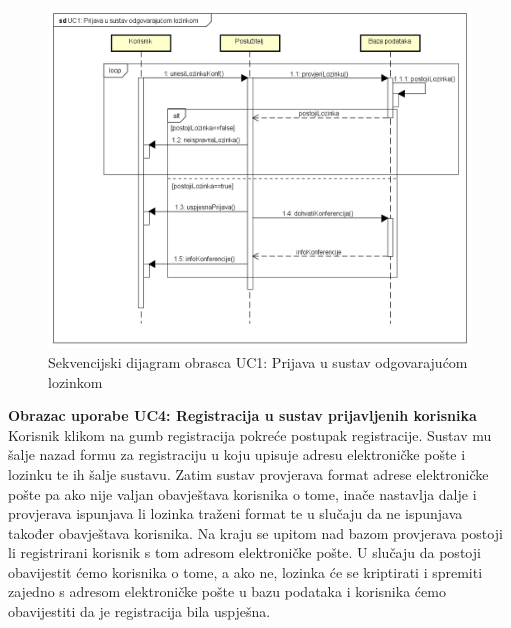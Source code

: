 				\begin{figure}[H]
					\includegraphics[width=\textwidth]{slike/uc1Sekvencijski.PNG} %
					\caption{Sekvencijski dijagram obrasca UC1: Prijava u sustav odgovarajućom lozinkom}
					\label{fig:uc1-sekvencijski} %
				\end{figure}
				\eject
					\textbf{Obrazac uporabe UC4: Registracija u sustav prijavljenih korisnika}\\
				Korisnik klikom na gumb registracija pokreće postupak registracije. Sustav mu šalje nazad formu za registraciju u koju upisuje adresu elektroničke pošte i lozinku te ih šalje sustavu. Zatim sustav provjerava format adrese elektroničke pošte pa ako nije valjan obavještava korisnika o tome, inače nastavlja dalje i provjerava ispunjava li lozinka traženi format te u slučaju da ne ispunjava također obavještava korisnika. Na kraju se upitom nad bazom provjerava postoji li registrirani korisnik s tom adresom elektroničke pošte. U slučaju da postoji obavijestit ćemo korisnika o tome, a ako ne, lozinka će se kriptirati i spremiti zajedno s adresom elektroničke pošte u bazu podataka i korisnika ćemo obavijestiti da je registracija bila uspješna.
				
